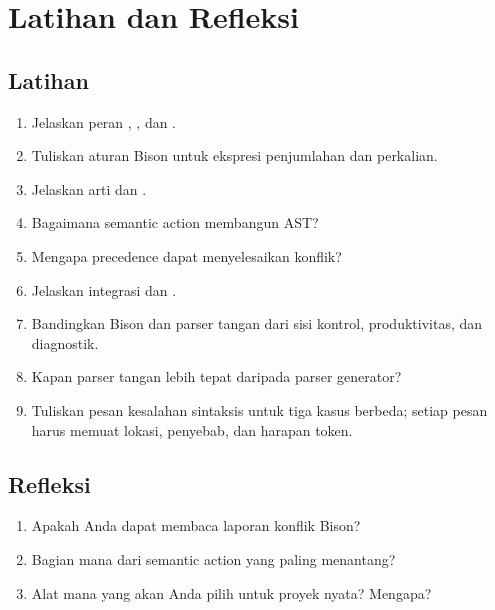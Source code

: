 \section*{Latihan dan Refleksi}

\subsection*{Latihan}
\begin{enumerate}[label=\arabic*.,leftmargin=*]
  \item Jelaskan peran , , dan
        .
  \item Tuliskan aturan Bison untuk ekspresi penjumlahan dan
        perkalian.
  \item Jelaskan arti \code{\$\$} dan .
  \item Bagaimana semantic action membangun AST?
  \item Mengapa precedence dapat menyelesaikan konflik?
  \item Jelaskan integrasi  dan .
  \item Bandingkan Bison dan parser tangan dari sisi kontrol,
        produktivitas, dan diagnostik.
  \item Kapan parser tangan lebih tepat daripada parser generator?
  \item Tuliskan pesan kesalahan sintaksis untuk tiga kasus berbeda;
        setiap pesan harus memuat lokasi, penyebab, dan harapan token.
\end{enumerate}

\subsection*{Refleksi}
\begin{reflectionbox}
\begin{enumerate}[label=\arabic*.,leftmargin=*]
  \item Apakah Anda dapat membaca laporan konflik Bison?
  \item Bagian mana dari semantic action yang paling menantang?
  \item Alat mana yang akan Anda pilih untuk proyek nyata? Mengapa?
\end{enumerate}
\end{reflectionbox}
